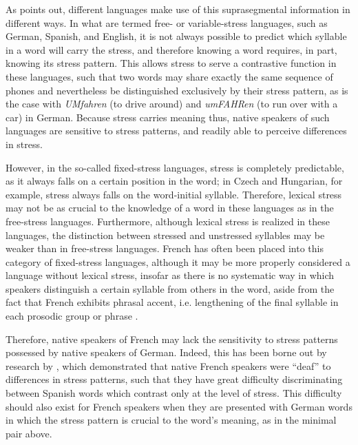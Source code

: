					As \textcite{Cutler2005} points out, different languages make use of this suprasegmental information in different ways.
			In what are termed free- or variable-stress languages, such as German, Spanish, and English, it is not always possible to predict which syllable in a word will carry the stress, and therefore knowing a word requires, in part, knowing its stress pattern. This allows stress to serve a contrastive function in these languages, such that two words may share exactly the same sequence of phones and nevertheless be distinguished exclusively by their stress pattern, as is the case with \textit{UMfahren} (to drive around) and \textit{umFAHRen} (to run over with a car) in German. %
Because stress carries meaning thus, native speakers of such languages are sensitive to stress patterns, and readily able to perceive differences in stress. %

			However, in the so-called fixed-stress languages, stress is completely predictable, as it always falls on a certain position in the word; in Czech and Hungarian, for example, stress always falls on the word-initial syllable. Therefore, lexical stress may not be as crucial to the knowledge of a word in these languages as in the free-stress languages. Furthermore, although lexical stress is realized in these languages, the distinction between stressed and unstressed syllables may be weaker than in free-stress languages. French has often been placed into this category of fixed-stress languages, although it may be more properly considered a language without lexical stress, insofar as there is no systematic way in which speakers distinguish a certain syllable from others in the word, aside from the fact that French exhibits phrasal accent, i.e. lengthening of the final syllable in each prosodic group or phrase \citep{Dupoux2008}. %
			
		Therefore, native speakers of French may lack the sensitivity to stress patterns possessed by native speakers of German. Indeed, this has been borne out by research by \citeauthor{Dupoux2008} \citep{Dupoux2001,Dupoux2008}, which demonstrated that native French speakers were ``deaf'' to differences in stress patterns, such that they have great difficulty discriminating between Spanish words which contrast only at the level of stress. This difficulty should also exist for French speakers when they are presented with German words in which the stress pattern is crucial to the word's meaning, as in the minimal pair above.
		
